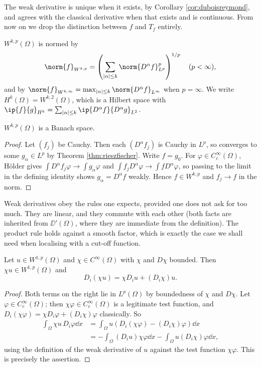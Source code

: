 The weak derivative is unique when it exists, by Corollary \ref{cor:duboisreymond}, and agrees with the classical derivative when that exists and is continuous. From now on we drop the distinction between $f$ and $T_f$ entirely.

\begin{definition}
	$W^{k,p}(\Omega)$ is normed by
	$$\norm{f}_{W^{k,p}}=\left(\sum_{|\alpha|\le k}\norm{D^\alpha f}_{L^p}^p\right)^{1/p} \quad (p<\infty),$$
	and by $\norm{f}_{W^{k,\infty}}=\max_{|\alpha|\le k}\norm{D^\alpha f}_{L^\infty}$ when $p = \infty$.
	We write $H^k(\Omega)=W^{k,2}(\Omega)$, which is a Hilbert space with $\ip{f}{g}_{H^k}=\sum_{|\alpha|\le k}\ip{D^\alpha f}{D^\alpha g}_{L^2}$.
\end{definition}

\begin{proposition}
	$W^{k,p}(\Omega)$ is a Banach space.
\end{proposition}

\begin{proof}
	Let $(f_j)$ be Cauchy. Then each $(D^\alpha f_j)$ is Cauchy in $L^p$, so converges to some $g_\alpha \in L^p$ by Theorem \ref{thm:rieszfischer}. Write $f = g_0$. For $\varphi\in C_c^\infty(\Omega)$, H\"older gives $\int D^\alpha f_j\varphi\to\int g_\alpha\varphi$ and $\int f_jD^\alpha\varphi\to\int fD^\alpha\varphi$, so passing to the limit in the defining identity shows $g_\alpha = D^\alpha f$ weakly. Hence $f \in W^{k,p}$ and $f_j \to f$ in the norm.
\end{proof}

Weak derivatives obey the rules one expects, provided one does not ask for too much. They are linear, and they commute with each other (both facts are inherited from $\DD'(\Omega)$, where they are immediate from the definition). The product rule holds against a smooth factor, which is exactly the case we shall need when localising with a cut-off function.

\begin{lemma}\label{lem:leibniz}
	Let $u \in W^{1,p}(\Omega)$ and $\chi \in C^\infty(\Omega)$ with $\chi$ and $D\chi$ bounded. Then $\chi u \in W^{1,p}(\Omega)$ and
	$$D_i(\chi u) = \chi D_iu + (D_i\chi)u.$$
\end{lemma}

\begin{proof}
	Both terms on the right lie in $L^p(\Omega)$ by boundedness of $\chi$ and $D\chi$. Let $\varphi \in C_c^\infty(\Omega)$; then $\chi\varphi \in C_c^\infty(\Omega)$ is a legitimate test function, and $D_i(\chi\varphi)=\chi D_i\varphi+(D_i\chi)\varphi$ classically. So
	\begin{align*}
		\int_\Omega \chi u \, D_i\varphi \dd x &= \int_\Omega u\left( D_i(\chi\varphi)-(D_i\chi)\varphi\right)\dd x \\
		&= -\int_\Omega (D_iu)\chi\varphi\dd x - \int_\Omega u (D_i\chi)\varphi\dd x,
	\end{align*}
	using the definition of the weak derivative of $u$ against the test function $\chi\varphi$. This is precisely the assertion.
\end{proof}

